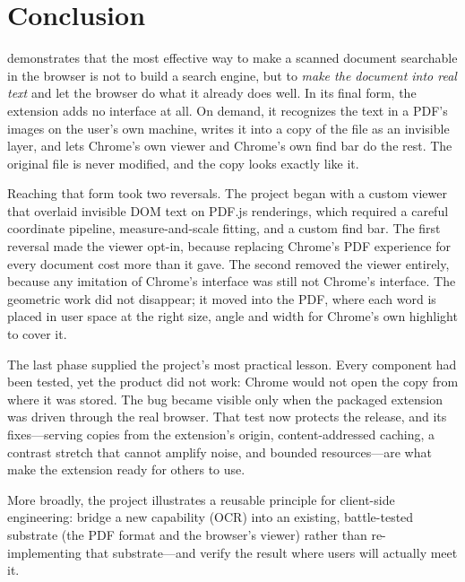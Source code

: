 \section{Conclusion}
\label{sec:conclusion}

\proj{} demonstrates that the most effective way to make a scanned document
searchable in the browser is not to build a search engine, but to \emph{make the
document into real text} and let the browser do what it already does well. In its
final form, the extension adds no interface at all. On demand, it recognizes the
text in a PDF's images on the user's own machine, writes it into a copy of the
file as an invisible layer, and lets Chrome's own viewer and Chrome's own find
bar do the rest. The original file is never modified, and the copy looks exactly
like it.

Reaching that form took two reversals. The project began with a custom viewer
that overlaid invisible DOM text on PDF.js renderings, which required a careful
coordinate pipeline, measure-and-scale fitting, and a custom find bar. The first
reversal made the viewer opt-in, because replacing Chrome's PDF experience for
every document cost more than it gave. The second removed the viewer entirely,
because any imitation of Chrome's interface was still not Chrome's interface. The
geometric work did not disappear; it moved into the PDF, where each word is placed
in user space at the right size, angle and width for Chrome's own highlight to
cover it.

The last phase supplied the project's most practical lesson. Every component
had been tested, yet the product did not work: Chrome would not open the copy
from where it was stored. The bug became visible only when the packaged extension
was driven through the real browser. That test now protects the release, and its
fixes---serving copies from the extension's origin, content-addressed caching, a
contrast stretch that cannot amplify noise, and bounded resources---are what make
the extension ready for others to use.

More broadly, the project illustrates a reusable principle for client-side
engineering: bridge a new capability (OCR) into an existing, battle-tested
substrate (the PDF format and the browser's viewer) rather than re-implementing
that substrate---and verify the result where users will actually meet it.
